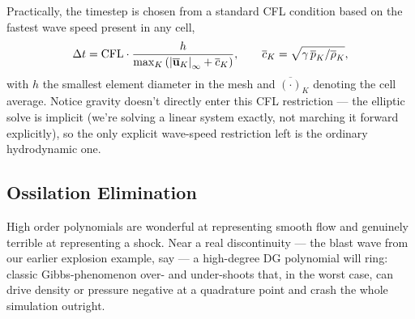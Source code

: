 Practically, the timestep is chosen from a standard CFL condition based on the fastest wave speed present in any cell,
\[
	\Delta t = \mathrm{CFL} \cdot \frac{h}{\max_K\left(\abs{\overline{\mathbf{u}}_K}_\infty + \overline{c}_K\right)}, \qquad \overline{c}_K = \sqrt{\gamma\, \overline{p}_K/\overline{\rho}_K},
\]
with $h$ the smallest element diameter in the mesh and $\overline{(\cdot)}_K$ denoting the cell average. Notice gravity doesn't directly enter this CFL restriction — the elliptic solve is implicit (we're solving a linear system exactly, not marching it forward explicitly), so the only explicit wave-speed restriction left is the ordinary hydrodynamic one.

\subsection{Ossilation Elimination}

High order polynomials are wonderful at representing smooth flow and genuinely terrible at representing a shock. Near a real discontinuity — the blast wave from our earlier explosion example, say — a high-degree DG polynomial will ring: classic Gibbs-phenomenon over- and under-shoots that, in the worst case, can drive density or pressure negative at a quadrature point and crash the whole simulation outright.

